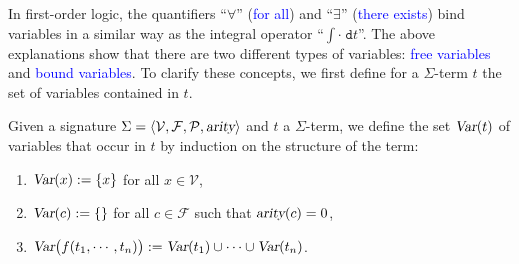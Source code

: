 In first-order logic, the quantifiers ``$\forall$'' (\textcolor{blue}{for all}) and ``$\exists$''
(\textcolor{blue}{there exists}) bind variables in a similar way as the integral operator
``$\int \cdot\; \mathtt{d}t$''. The above explanations show that there are two different types of 
variables: \textcolor{blue}{free variables} and \textcolor{blue}{bound variables}.
To clarify these concepts, we first define for a
$\Sigma$-term $t$ the set of variables contained in $t$.

\begin{Definition}[$\var(t)$]
  Given a signature $\Sigma = \langle \mathcal{V}, \mathcal{F}, \mathcal{P}, \textsl{arity} \rangle$ and
  $t$ a $\Sigma$-term, we define the set \textcolor{blue}{$\var(t)$} of variables that occur in $t$
  by induction on the structure of the term:
  \begin{enumerate}
    \item $\textsl{Var}(x) := \{ x \}$ \quad for all $x \in \mathcal{V}$,
    \item $\textsl{Var}(c) := \{ \}$ \quad for all $c \in \mathcal{F}$ such that $\textsl{arity}(c) = 0$,
    \item $\textsl{Var}\bigl(f(t_1,\cdots,t_n)\bigr) := \textsl{Var}(t_1) \cup \cdots \cup \textsl{Var}(t_n)$.
          \eox
  \end{enumerate}
\end{Definition}

